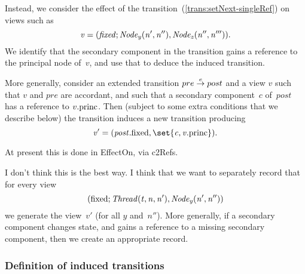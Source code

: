 Instead, we consider the effect of the 
transition~(\ref{trans:setNext-singleRef}) on views such as
\[\mit
v = (fixed; Node_y(n', n''), Node_z(n'', n''')).
\]
We identify that the secondary component in the  transition gains a
reference to the principal node of~$v$, and use that to deduce the induced
transition. 

More generally, consider an extended transition $pre \trans{e} post$ and a
view $v$ such that $v$ and $pre$ are accordant, and such that a secondary
component~$c$ of~$post$ has a reference to $v.\princ$.  Then (subject to some
extra conditions that we describe below) the transition induces a new
transition producing
\[\mit
v' = (post.\fixed, \set{c, v.\princ}).
\]

\begin{impNote}
At present this is done in EffectOn, via c2Refs. 
\end{impNote}

\begin{improve}
I don't think this is the
best way.  I think that we want to separately record that for every view
\[\mit 
(\fixed; Thread(t, n, n'), Node_y(n', n''))
\]
we generate the view~$v'$ (for all $y$ and~$n''$).  More generally, if a
secondary component changes state, and gains a reference to a missing
secondary component, then we create an appropriate record.
\end{improve}



\subsubsection{Definition of induced transitions}

